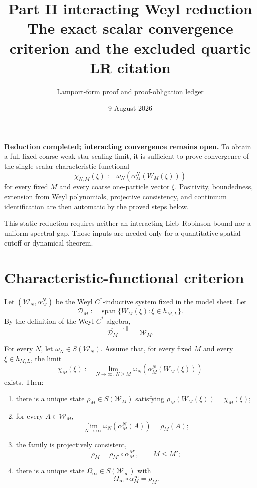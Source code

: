 \documentclass[11pt,a4paper]{article}
\title{Part II interacting Weyl reduction\\[3pt]
\large The exact scalar convergence criterion and the excluded quartic LR citation}
\author{Lamport-form proof and proof-obligation ledger}
\date{9 August 2026}
\newcommand{\W}{\mathcal W}
\begin{document}
\maketitle

\begin{resultbox}
\textbf{Reduction completed; interacting convergence remains open.}  To obtain a full
fixed-coarse weak-star scaling limit, it is sufficient to prove convergence of the
single scalar characteristic functional
\[
 \chi_{N,M}(\xi):=\omega_N(\alpha_M^N(W_M(\xi)))
\]
for every fixed \(M\) and every coarse one-particle vector \(\xi\).  Positivity,
boundedness, extension from Weyl polynomials, projective consistency, and continuum
identification are then automatic by the proved steps below.

This static reduction requires neither an interacting Lieb--Robinson bound nor a
uniform spectral gap.  Those inputs are needed only for a quantitative spatial-cutoff
or dynamical theorem.
\end{resultbox}

\tableofcontents

\section{Characteristic-functional criterion}

Let \((\W_N,\alpha_M^N)\) be the Weyl \(C^*\)-inductive system fixed in the
model sheet.  Let
\[
 \mathcal D_M:=\operatorname{span}\{W_M(\xi):\xi\in h_{M,L}\}.   \tag{1.1}
\]
By the definition of the Weyl \(C^*\)-algebra,
\[
 \overline{\mathcal D_M}^{\|\cdot\|}=\W_M.                     \tag{1.2}
\]

\begin{theorem}\label{thm:weylcriterion}
For every \(N\), let \(\omega_N\in S(\W_N)\).  Assume that, for every fixed
\(M\) and every \(\xi\in h_{M,L}\), the limit
\[
 \chi_M(\xi):=
 \lim_{N\to\infty,\ N\ge M}
 \omega_N(\alpha_M^N(W_M(\xi)))                               \tag{1.3}
\]
exists.  Then:
\begin{enumerate}
\item there is a unique state \(\rho_M\in S(\W_M)\) satisfying
      \(\rho_M(W_M(\xi))=\chi_M(\xi)\);
\item for every \(A\in\W_M\),
      \[
       \lim_{N\to\infty}\omega_N(\alpha_M^N(A))=\rho_M(A);     \tag{1.4}
      \]
\item the family is projectively consistent,
      \[
       \rho_M=\rho_{M'}\circ\alpha_M^{M'},\qquad M\le M';      \tag{1.5}
      \]
\item there is a unique state \(\Omega_\infty\in S(\W_\infty)\) with
      \[
       \Omega_\infty\circ\alpha_M^\infty=\rho_M.               \tag{1.6}
      \]
\end{enumerate}
\end{theorem}
\end{document}
